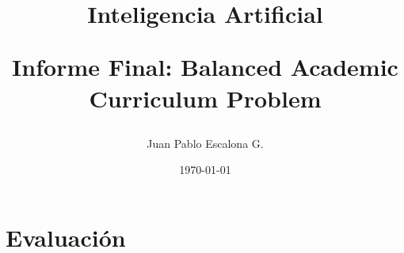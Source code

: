 \documentclass[letterpaper,10pt]{article}
\begin{document}
\title{Inteligencia Artificial \\
 \begin{Large}Informe Final: Balanced Academic Curriculum Problem\end{Large}}


\author{Juan Pablo Escalona G.}


\date{\today}

\maketitle




\section*{Evaluación}
\end{document}
